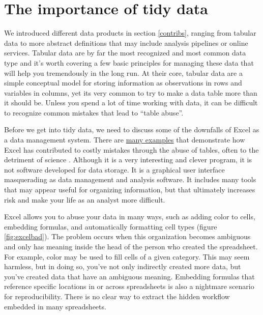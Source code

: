 \documentclass[
]{book}
\begin{document}
\hypertarget{whytidy}{%
\section{The importance of tidy data}\label{whytidy}}

We introduced different data products in section \ref{contribs}, ranging from tabular data to more abstract definitions that may include analysis pipelines or online services. Tabular data are by far the most recognized and most common data type and it's worth covering a few basic principles for managing these data that will help you tremendously in the long run. At their core, tabular data are a simple conceptual model for storing information as observations in rows and variables in columns, yet its very common to try to make a data table more than it should be. Unless you spend a lot of time working with data, it can be difficult to recognize common mistakes that lead to ``table abuse''.

Before we get into tidy data, we need to discuss some of the downfalls of Excel as a data management system. There are \href{http://www.eusprig.org/horror-stories.htm}{many examples} that demonstrate how Excel has contributed to costly mistakes through the abuse of tables, often to the detriment of science \citep{Ziemann16}. Although it is a very interesting and clever program, it is not software developed for data storage. It is a graphical user interface masquerading as data management and analysis software. It includes many tools that may appear useful for organizing information, but that ultimately increases risk and make your life as an analyst more difficult.

Excel allows you to abuse your data in many ways, such as adding color to cells, embedding formulas, and automatically formatting cell types (figure \ref{fig:excelbad}). The problem occurs when this organization becomes ambiguous and only has meaning inside the head of the person who created the spreadsheet. For example, color may be used to fill cells of a given category. This may seem harmless, but in doing so, you've not only indirectly created more data, but you've created data that have an ambiguous meaning. Embedding formulas that reference specific locations in or across spreadsheets is also a nightmare scenario for reproducibility. There is no clear way to extract the hidden workflow embedded in many spreadsheets.
\end{document}
